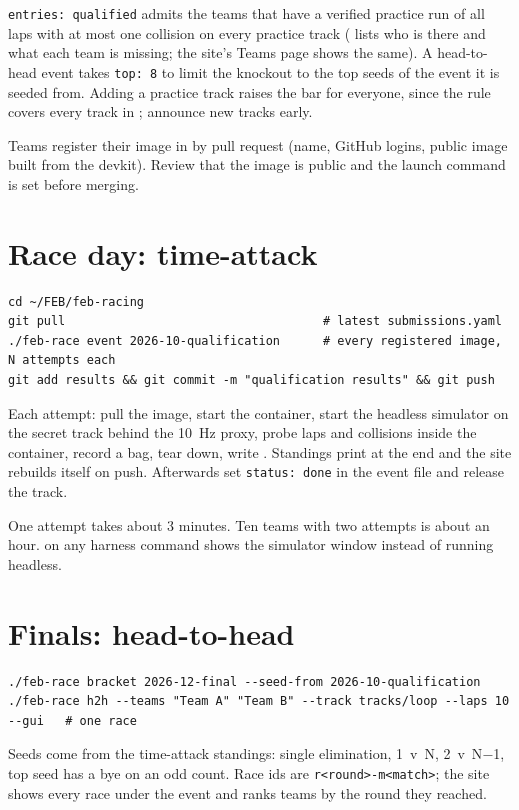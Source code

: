 \documentclass[11pt,a4paper]{article}
\begin{document}
\texttt{entries: qualified} admits the teams that have a verified practice run of all laps
with at most one collision on every practice track ( lists who is
there and what each team is missing; the site's Teams page shows the same). A head-to-head
event takes \texttt{top: 8} to limit the knockout to the top seeds of the event it is seeded
from. Adding a practice track raises the bar for everyone, since the rule covers every
track in ; announce new tracks early.

Teams register their image in  by pull request (name, GitHub logins,
public image built from the devkit). Review that the image is public and the launch command
is set before merging.

\section{Race day: time-attack}

\begin{lstlisting}
cd ~/FEB/feb-racing
git pull                                    # latest submissions.yaml
./feb-race event 2026-10-qualification      # every registered image, N attempts each
git add results && git commit -m "qualification results" && git push
\end{lstlisting}

Each attempt: pull the image, start the container, start the headless simulator on the
secret track behind the 10~Hz proxy, probe laps and collisions inside the container, record a
bag, tear down, write . Standings print at the end and the site rebuilds
itself on push. Afterwards set \texttt{status: done} in the event file and release the track.

One attempt takes about 3 minutes. Ten teams with two attempts is about an hour.
 on any harness command shows the simulator window instead of running headless.

\section{Finals: head-to-head}

\begin{lstlisting}
./feb-race bracket 2026-12-final --seed-from 2026-10-qualification
./feb-race h2h --teams "Team A" "Team B" --track tracks/loop --laps 10 --gui   # one race
\end{lstlisting}

Seeds come from the time-attack standings: single elimination, 1~v~N, 2~v~N$-$1, top seed
has a bye on an odd count. Race ids are \texttt{r<round>-m<match>}; the site shows every race
under the event and ranks teams by the round they reached.
\end{document}
